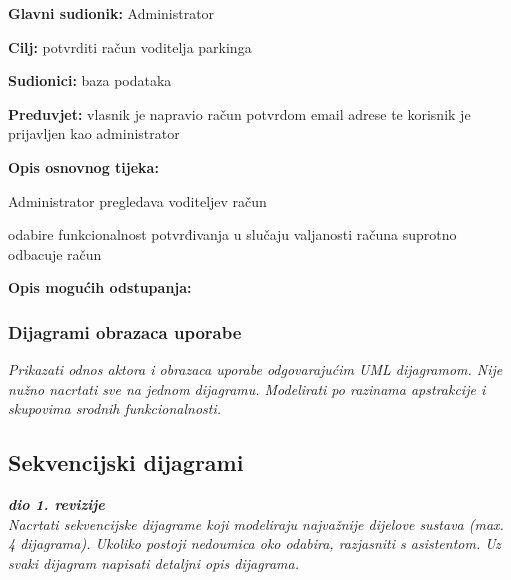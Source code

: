     				\noindent {}
    				\begin{packed_item}
    					
    					\item \textbf{Glavni sudionik: } Administrator
    					\item  \textbf{Cilj:} potvrditi račun voditelja parkinga
    					\item  \textbf{Sudionici:}  baza podataka
    					\item  \textbf{Preduvjet:} vlasnik je napravio račun potvrdom email adrese te korisnik je prijavljen kao administrator
    					\item  \textbf{Opis osnovnog tijeka:}
    					
    					\item[] \begin{packed_enum}
    						
    						\item Administrator pregledava voditeljev račun
    						\item odabire funkcionalnost potvrđivanja u slučaju valjanosti računa suprotno odbacuje račun

    					\end{packed_enum}
    					
    					\item  \textbf{Opis mogućih odstupanja:}
    					
    					
    				\end{packed_item}
    				
				
					
				\subsubsection{Dijagrami obrazaca uporabe}
					
					\textit{Prikazati odnos aktora i obrazaca uporabe odgovarajućim UML dijagramom. Nije nužno nacrtati sve na jednom dijagramu. Modelirati po razinama apstrakcije i skupovima srodnih funkcionalnosti.}
				\eject		
				
			\subsection{Sekvencijski dijagrami}
				
				\textbf{\textit{dio 1. revizije}}\\
				
				\textit{Nacrtati sekvencijske dijagrame koji modeliraju najvažnije dijelove sustava (max. 4 dijagrama). Ukoliko postoji nedoumica oko odabira, razjasniti s asistentom. Uz svaki dijagram napisati detaljni opis dijagrama.}
				\eject
	
